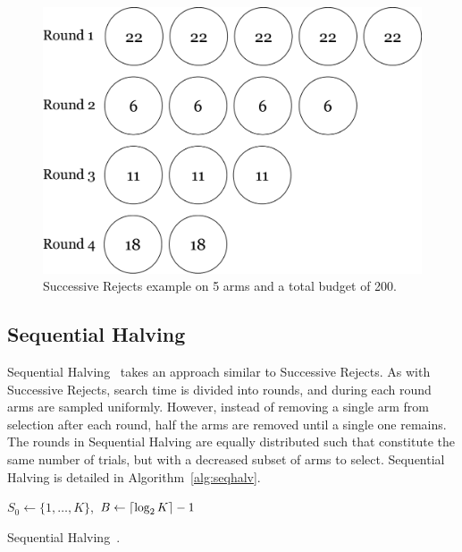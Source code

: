 \documentclass{kecsmstr}
\DeclarePairedDelimiter{\ceil}{\lceil}{\rceil}
\DeclarePairedDelimiter{\floor}{\lfloor}{\rfloor}
\begin{document}
\begin{figure}[ht]
	\centering
	\includegraphics[width=.6\textwidth]{img/succ_rej.png}
	\caption[Successive Rejects example]{Successive Rejects example on 5 arms and a total budget of 200.}
	\label{fig:succ-rej}
\end{figure}

\newpage

\subsection{Sequential Halving}
Sequential Halving~ takes an approach similar to Successive Rejects. As with Successive Rejects, search time is divided into rounds, and during each round arms are sampled uniformly. However, instead of removing a single arm from selection after each round, half the arms are removed until a single one remains. The rounds in Sequential Halving are equally distributed such that constitute the same number of trials, but with a decreased subset of arms to select. Sequential Halving is detailed in Algorithm~\ref{alg:seqhalv}.

\IncMargin{1em}
\begin{algorithm2e}[ht]
	\vspace{0.1cm}
	$S_0 \gets \{1,\dots,K\}$,
	$B \gets \ceil{\log_2{K}} - 1$														\;
	\BlankLine
  \caption[Sequential Halving]{Sequential Halving~\protect{}. \label{alg:seqhalv}}
\end{algorithm2e}
\DecMargin{1em}
\end{document}
